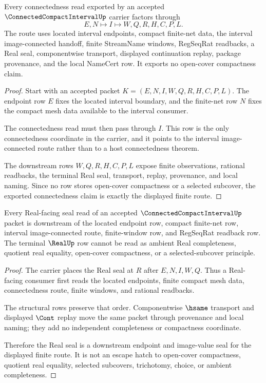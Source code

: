 \begin{theorem}
\label{thm:connected-compact-interval-route}
Every connectedness read exported by an accepted $\ConnectedCompactIntervalUp$ carrier factors through
$$
E,N \longmapsto I \longmapsto W,Q,R,H,C,P,L .
$$
The route uses located interval endpoints, compact finite-net data, the interval image-connected handoff, finite StreamName windows, RegSeqRat readbacks, a Real seal, componentwise transport, displayed continuation replay, package provenance, and the local NameCert row. It exports no open-cover compactness claim.
\end{theorem}
\begin{proof}
Start with an accepted packet $K=(E,N,I,W,Q,R,H,C,P,L)$. The endpoint row $E$ fixes the located interval boundary, and the finite-net row $N$ fixes the compact mesh data available to the interval consumer.

The connectedness read must then pass through $I$. This row is the only connectedness coordinate in the carrier, and it points to the interval image-connected route rather than to a host connectedness theorem.

The downstream rows $W,Q,R,H,C,P,L$ expose finite observations, rational readbacks, the terminal Real seal, transport, replay, provenance, and local naming. Since no row stores open-cover compactness or a selected subcover, the exported connectedness claim is exactly the displayed finite route.
\end{proof}

\begin{theorem}
\label{thm:connected-compact-interval-real-seal-nonescape}
Every Real-facing seal read of an accepted $\ConnectedCompactIntervalUp$ packet is downstream of the located endpoint row, compact finite-net row, interval image-connected route, finite-window row, and RegSeqRat readback row. The terminal $\RealUp$ row cannot be read as ambient Real completeness, quotient real equality, open-cover compactness, or a selected-subcover principle.
\end{theorem}
\begin{proof}
The carrier places the Real seal at $R$ after $E,N,I,W,Q$. Thus a Real-facing consumer first reads the located endpoints, finite compact mesh data, connectedness route, finite windows, and rational readbacks.

The structural rows preserve that order. Componentwise $\hsame$ transport and displayed $\Cont$ replay move the same packet through provenance and local naming; they add no independent completeness or compactness coordinate.

Therefore the Real seal is a downstream endpoint and image-value seal for the displayed finite route. It is not an escape hatch to open-cover compactness, quotient real equality, selected subcovers, trichotomy, choice, or ambient completeness.
\end{proof}

